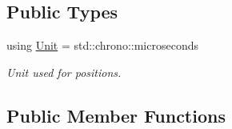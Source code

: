 \subsection*{Public Types}
\begin{DoxyCompactItemize}
\item 
\hypertarget{classPlayerPosition_a535c99057ceca21d8fbe82883c592a66}{using \hyperlink{classPlayerPosition_a535c99057ceca21d8fbe82883c592a66}{Unit} = std\+::chrono\+::microseconds}\label{classPlayerPosition_a535c99057ceca21d8fbe82883c592a66}

\begin{DoxyCompactList}\small\item\em Unit used for positions. \end{DoxyCompactList}\end{DoxyCompactItemize}
\subsection*{Public Member Functions}
